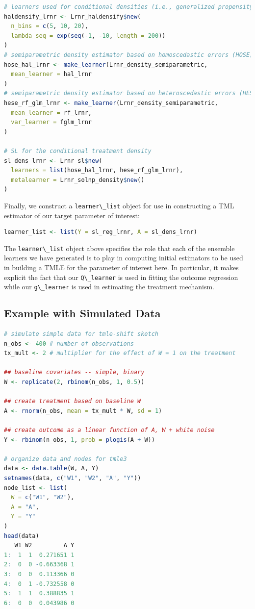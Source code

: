 \documentclass[
  12pt, krantz2,
]{krantz}
\newcommand{\passthrough}[1]{#1}
\theoremstyle{definition}
\theoremstyle{definition}
\theoremstyle{definition}
\newcommand{\1}{\mathbbm{1}}
\begin{document}
\begin{lstlisting}[language=R]
# learners used for conditional densities (i.e., generalized propensity score)
haldensify_lrnr <- Lrnr_haldensify$new(
  n_bins = c(5, 10, 20),
  lambda_seq = exp(seq(-1, -10, length = 200))
)
# semiparametric density estimator based on homoscedastic errors (HOSE)
hose_hal_lrnr <- make_learner(Lrnr_density_semiparametric,
  mean_learner = hal_lrnr
)
# semiparametric density estimator based on heteroscedastic errors (HESE)
hese_rf_glm_lrnr <- make_learner(Lrnr_density_semiparametric,
  mean_learner = rf_lrnr,
  var_learner = fglm_lrnr
)

# SL for the conditional treatment density
sl_dens_lrnr <- Lrnr_sl$new(
  learners = list(hose_hal_lrnr, hese_rf_glm_lrnr),
  metalearner = Lrnr_solnp_density$new()
)
\end{lstlisting}

Finally, we construct a \passthrough{\lstinline!learner\_list!} object for use in constructing a TML
estimator of our target parameter of interest:

\begin{lstlisting}[language=R]
learner_list <- list(Y = sl_reg_lrnr, A = sl_dens_lrnr)
\end{lstlisting}

The \passthrough{\lstinline!learner\_list!} object above specifies the role that each of the ensemble
learners we have generated is to play in computing initial estimators to be
used in building a TMLE for the parameter of interest here. In particular, it
makes explicit the fact that our \passthrough{\lstinline!Q\_learner!} is used in fitting the outcome
regression while our \passthrough{\lstinline!g\_learner!} is used in estimating the treatment mechanism.

\hypertarget{example-with-simulated-data}{%
\subsection{Example with Simulated Data}\label{example-with-simulated-data}}

\begin{lstlisting}[language=R]
# simulate simple data for tmle-shift sketch
n_obs <- 400 # number of observations
tx_mult <- 2 # multiplier for the effect of W = 1 on the treatment

## baseline covariates -- simple, binary
W <- replicate(2, rbinom(n_obs, 1, 0.5))

## create treatment based on baseline W
A <- rnorm(n_obs, mean = tx_mult * W, sd = 1)

## create outcome as a linear function of A, W + white noise
Y <- rbinom(n_obs, 1, prob = plogis(A + W))

# organize data and nodes for tmle3
data <- data.table(W, A, Y)
setnames(data, c("W1", "W2", "A", "Y"))
node_list <- list(
  W = c("W1", "W2"),
  A = "A",
  Y = "Y"
)
head(data)
   W1 W2         A Y
1:  1  1  0.271651 1
2:  0  0 -0.663368 1
3:  0  0  0.113366 0
4:  0  1 -0.732558 0
5:  1  1  0.388835 1
6:  0  0  0.043986 0
\end{lstlisting}
\end{document}
